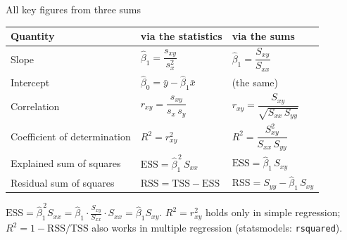 \documentclass[aspectratio=169,11pt]{beamer}
\begin{document}
\begin{frame}{All key figures from three sums}
  \begin{center}
    \renewcommand{\arraystretch}{1.3}
    \begin{tabular}{@{}l l l@{}}
      \toprule
      \textbf{Quantity} & \textbf{via the statistics} & \textbf{via the sums} \\
      \midrule
      Slope                   & $\hat{\beta}_1 = \dfrac{s_{xy}}{s_x^{2}}$       & $\hat{\beta}_1 = \dfrac{S_{xy}}{S_{xx}}$ \\
      Intercept               & $\hat{\beta}_0 = \bar{y} - \hat{\beta}_1 \bar{x}$ & (the same) \\
      Correlation             & $r_{xy} = \dfrac{s_{xy}}{s_x\,s_y}$             & $r_{xy} = \dfrac{S_{xy}}{\sqrt{S_{xx}\,S_{yy}}}$ \\[7pt]
      Coefficient of determination & $R^{2} = r_{xy}^{2}$                       & $R^{2} = \dfrac{S_{xy}^{2}}{S_{xx}\,S_{yy}}$ \\
      Explained sum of squares & $\text{ESS} = \hat{\beta}_1^{\,2}\,S_{xx}$     & $\text{ESS} = \hat{\beta}_1\,S_{xy}$ \\
      Residual sum of squares  & $\text{RSS} = \text{TSS} - \text{ESS}$         & $\text{RSS} = S_{yy} - \hat{\beta}_1\,S_{xy}$ \\
      \bottomrule
    \end{tabular}
  \end{center}
  \vspace{-4pt}
  \footnotesize $\text{ESS} = \hat{\beta}_1^{\,2}S_{xx} = \hat{\beta}_1 \cdot \frac{S_{xy}}{S_{xx}}\cdot S_{xx} = \hat{\beta}_1 S_{xy}$.
  $R^{2} = r_{xy}^{2}$ holds only in simple regression;
  $R^2=1-\text{RSS}/\text{TSS}$ also works in multiple regression
  (statsmodels: \texttt{rsquared}).
\end{frame}
\end{document}
